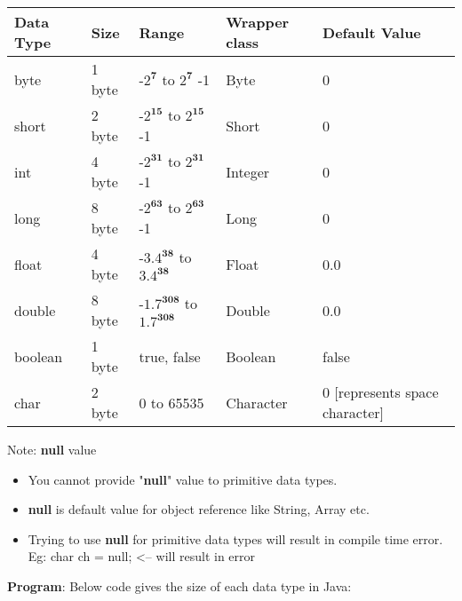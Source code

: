 
\begin{flushleft}

	\begin{tabulary}{1.0\textwidth}{|p{5em}|p{3em}|p{7em}|p{5em}|p{5em}|}
		\toprule
		\textbf{Data Type} & \textbf{Size} & \textbf{Range} & \textbf{Wrapper class} & \textbf{Default Value}   \\
		\midrule
		byte & 1 byte & -$2^\textbf{7}$ to $2^\textbf{7}$ -1 & Byte & 0  \\
		\hline
		short & 2 byte & -$2^\textbf{15}$ to $2^\textbf{15}$ -1 & Short & 0  \\
		\hline
		int & 4 byte & -$2^\textbf{31}$ to $2^\textbf{31}$ -1 & Integer & 0 \\
		\hline
		long & 8 byte & -$2^\textbf{63}$ to $2^\textbf{63}$ -1 & Long & 0 \\
		\hline
		float & 4 byte & -$3.4^\textbf{38}$ to $3.4^\textbf{38}$ & Float & 0.0 \\
		\hline
		double & 8 byte & -$1.7^\textbf{308}$ to $1.7^\textbf{308}$ & Double & 0.0  \\
		\hline
		boolean & 1 byte & true, false & Boolean & false  \\
		\hline
		char & 2 byte  & 0 to 65535 & Character & 0 [represents space character] \\
		\bottomrule
	\end{tabulary}
	
	\bigskip
	\begin{tcolorbox}[breakable,notitle,boxrule=-1pt,colback=yellow,colframe=yellow]
		\color{black}
		Note: \textbf{null} value
		\begin{itemize}
			\item You cannot provide "\textbf{null}" value to primitive data types.
			\item \textbf{null} is default value for object reference like String, Array etc.
			\item Trying to use \textbf{null} for primitive data types will result in compile time error.
			\newline
			Eg: char ch = null; <-- will result in error
		\end{itemize}
	\end{tcolorbox}
	
	\newpage
	\textbf{Program}: Below code gives the size of each data type in Java:
	

\end{flushleft}

